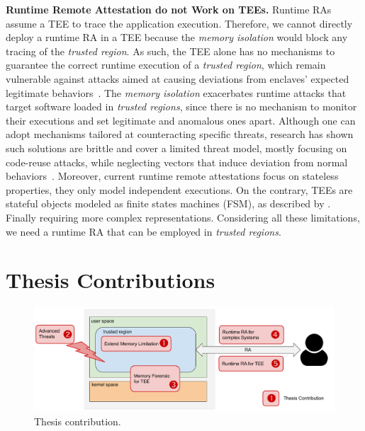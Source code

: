 \vspace{0.5cm}
\noindent \textbf{Runtime Remote Attestation do not Work on TEEs.}
Runtime RAs assume a TEE to trace the application execution.
Therefore, we cannot directly deploy a runtime RA in a TEE because the 
\emph{memory isolation} would block any tracing of the \emph{trusted region}.
As such, the TEE alone has no mechanisms to guarantee the correct runtime 
execution of a \emph{trusted region}, which remain vulnerable against
attacks aimed at causing deviations from enclaves' expected legitimate
behaviors~\citep{tale-two-worlds,teerex,biondo2018guard,lee2017hacking,snakegx}.
The \emph{memory isolation} exacerbates runtime attacks that target 
software loaded in \emph{trusted regions}, since there is no mechanism to 
monitor their executions and set legitimate and anomalous ones apart.
Although one can adopt mechanisms tailored at counteracting 
specific threats, research has shown such solutions are brittle and cover a 
limited threat model, mostly focusing on code-reuse attacks, while neglecting 
vectors that induce deviation from normal
behaviors~\citep{tale-two-worlds,teerex,biondo2018guard,lee2017hacking}.
Moreover, current runtime remote attestations focus on
stateless properties, \ie they only model independent executions.  On
the contrary, TEEs are stateful objects modeled as finite states
machines (FSM), as described by \cite{costan2016intel}.
Finally requiring more complex representations.
Considering all these limitations, we need a runtime RA that can be employed in 
\emph{trusted regions}.

\section{Thesis Contributions}

\begin{figure}[t]
	\centering
	\includegraphics[width=\textwidth]{fig_c1/contribution.pdf}
	\caption[Thesis contribution.]{Thesis contribution.}
	\label{fig:contribution}
\end{figure}

